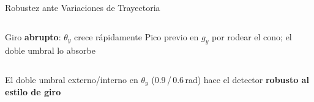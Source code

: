 \documentclass[10pt,aspectratio=169]{beamer}
\begin{document}
\begin{frame}{Robustez ante Variaciones de Trayectoria}
  \begin{columns}[c]
      \centering
      {\tiny Giro \textbf{abrupto}: $\theta_y$ crece rápidamente}
      \centering
      {\tiny Pico previo en $g_y$ por rodear el cono; el doble umbral lo absorbe}
  \end{columns}
  \vspace{0.4em}
  \begin{center}
    {\small El doble umbral externo/interno en $\theta_y$
    (0.9\,/\,0.6\,rad) hace el detector \textbf{robusto al estilo de giro}}
  \end{center}
\end{frame}
\end{document}
